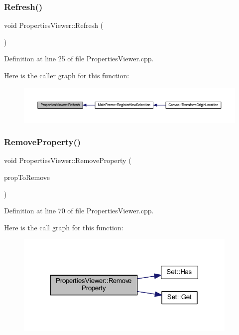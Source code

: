 \subsubsection{\texorpdfstring{Refresh()}{Refresh()}}
{\footnotesize\ttfamily void Properties\+Viewer\+::\+Refresh (\begin{DoxyParamCaption}{ }\end{DoxyParamCaption})}



Definition at line 25 of file Properties\+Viewer.\+cpp.

Here is the caller graph for this function\+:
\nopagebreak
\begin{figure}[H]
\begin{center}
\leavevmode
\includegraphics[width=350pt]{class_properties_viewer_aac1a5924495246147e465375a686d938_icgraph}
\end{center}
\end{figure}
\mbox{\label{class_properties_viewer_a17827ffbcf53b5dc5cd2d0873d2bf2e7}} 
\subsubsection{\texorpdfstring{Remove\+Property()}{RemoveProperty()}}
{\footnotesize\ttfamily void Properties\+Viewer\+::\+Remove\+Property (\begin{DoxyParamCaption}\item[{wx\+P\+G\+Property $\ast$}]{prop\+To\+Remove }\end{DoxyParamCaption})}



Definition at line 70 of file Properties\+Viewer.\+cpp.

Here is the call graph for this function\+:
\nopagebreak
\begin{figure}[H]
\begin{center}
\leavevmode
\includegraphics[width=302pt]{class_properties_viewer_a17827ffbcf53b5dc5cd2d0873d2bf2e7_cgraph}
\end{center}
\end{figure}
\mbox{\label{class_properties_viewer_a610dc708815ecdc748c2898551f086c0}} 
